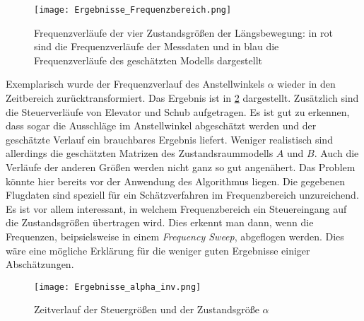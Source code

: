 \begin{figure}[h!]
	\centering
	\texttt{[image: Ergebnisse\_Frequenzbereich.png]}
	\caption{Frequenzverläufe der vier Zustandsgrößen der Längsbewegung: in rot sind die Frequenzverläufe der Messdaten und 
	in blau die Frequenzverläufe des geschätzten Modells dargestellt}
	\label{fig:Ergebnisse_f}
\end{figure}

Exemplarisch wurde der Frequenzverlauf des Anstellwinkels $\alpha$ wieder in den Zeitbereich zurücktransformiert. Das 
Ergebnis ist in \cref{fig:Ergebnisse_t} dargestellt. Zusätzlich sind die Steuerverläufe von Elevator und Schub aufgetragen. 
Es ist gut zu erkennen, dass sogar die Ausschläge im Anstellwinkel abgeschätzt werden und der geschätzte Verlauf ein 
brauchbares Ergebnis liefert. Weniger realistisch sind allerdings die geschätzten Matrizen des Zustandsraummodells $A$ und 
$B$. Auch die Verläufe der anderen Größen werden nicht ganz so gut angenähert. Das Problem könnte hier bereits vor der 
Anwendung des Algorithmus liegen. Die gegebenen Flugdaten sind speziell für ein Schätzverfahren im Frequenzbereich 
unzureichend. Es ist vor allem interessant, in welchem Frequenzbereich ein Steuereingang auf die Zustandsgrößen übertragen 
wird. Dies erkennt man dann, wenn die Frequenzen, beipsielsweise in einem \textit{Frequency Sweep}, abgeflogen werden. Dies 
wäre eine mögliche Erklärung für die weniger guten Ergebnisse einiger Abschätzungen.

\begin{figure}[h!]
	\centering
	\texttt{[image: Ergebnisse\_alpha\_inv.png]}
	\caption{Zeitverlauf der Steuergrößen und der Zustandsgröße $\alpha$}
	\label{fig:Ergebnisse_t}
\end{figure}